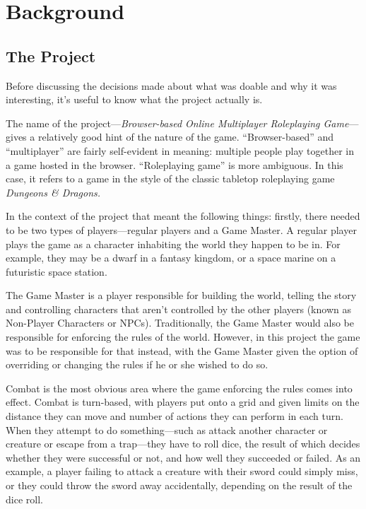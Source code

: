 \section{Background}

\subsection{The Project}
Before discussing the decisions made about what was doable and why it was interesting, it's useful to know what the project actually is.

The name of the project---\textit{Browser-based Online Multiplayer Roleplaying Game}---gives a relatively good hint of the nature of the game. ``Browser-based'' and ``multiplayer'' are fairly self-evident in meaning: multiple people play together in a game hosted in the browser. ``Roleplaying game'' is more ambiguous. In this case, it refers to a game in the style of the classic tabletop roleplaying game \textit{Dungeons \& Dragons.}

In the context of the project that meant the following things: firstly, there needed to be two types of players---regular players and a Game Master. A regular player plays the game as a character inhabiting the world they happen to be in. For example, they may be a dwarf in a fantasy kingdom, or a space marine on a futuristic space station.

The Game Master is a player responsible for building the world, telling the story and controlling characters that aren't controlled by the other players (known as Non-Player Characters or NPCs). Traditionally, the Game Master would also be responsible for enforcing the rules of the world. However, in this project the game was to be responsible for that instead, with the Game Master given the option of overriding or changing the rules if he or she wished to do so.

Combat is the most obvious area where the game enforcing the rules comes into effect. Combat is turn-based, with players put onto a grid and given limits on the distance they can move and number of actions they can perform in each turn. When they attempt to do something---such as attack another character or creature or escape from a trap---they have to roll dice, the result of which decides whether they were successful or not, and how well they succeeded or failed. As an example, a player failing to attack a creature with their sword could simply miss, or they could throw the sword away accidentally, depending on the result of the dice roll.

